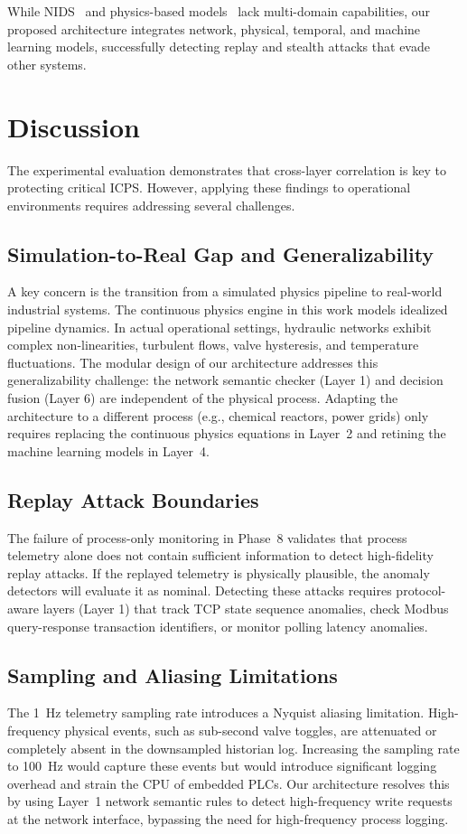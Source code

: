 \documentclass[journal,twoside,web]{ieeecolor}
\begin{document}
While NIDS~\cite{iec104sec2023} and physics-based models~\cite{lucchese2023honeyics} lack multi-domain capabilities, our proposed architecture integrates network, physical, temporal, and machine learning models, successfully detecting replay and stealth attacks that evade other systems.

\section{Discussion} \label{section:discussion}

The experimental evaluation demonstrates that cross-layer correlation is key to protecting critical ICPS. However, applying these findings to operational environments requires addressing several challenges.

\subsection{Simulation-to-Real Gap and Generalizability}
A key concern is the transition from a simulated physics pipeline to real-world industrial systems. The continuous physics engine in this work models idealized pipeline dynamics. In actual operational settings, hydraulic networks exhibit complex non-linearities, turbulent flows, valve hysteresis, and temperature fluctuations. The modular design of our architecture addresses this generalizability challenge: the network semantic checker (Layer 1) and decision fusion (Layer 6) are independent of the physical process. Adapting the architecture to a different process (e.g., chemical reactors, power grids) only requires replacing the continuous physics equations in Layer~2 and retining the machine learning models in Layer~4.

\subsection{Replay Attack Boundaries}
The failure of process-only monitoring in Phase~8 validates that process telemetry alone does not contain sufficient information to detect high-fidelity replay attacks. If the replayed telemetry is physically plausible, the anomaly detectors will evaluate it as nominal. Detecting these attacks requires protocol-aware layers (Layer 1) that track TCP state sequence anomalies, check Modbus query-response transaction identifiers, or monitor polling latency anomalies.

\subsection{Sampling and Aliasing Limitations}
The 1~Hz telemetry sampling rate introduces a Nyquist aliasing limitation. High-frequency physical events, such as sub-second valve toggles, are attenuated or completely absent in the downsampled historian log. Increasing the sampling rate to 100~Hz would capture these events but would introduce significant logging overhead and strain the CPU of embedded PLCs. Our architecture resolves this by using Layer~1 network semantic rules to detect high-frequency write requests at the network interface, bypassing the need for high-frequency process logging.
\end{document}
